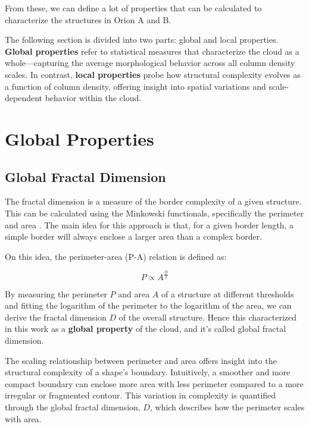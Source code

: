 From these, we can define a lot of properties that can be calculated to characterize the structures in Orion A and B. 

The following section is divided into two parts: global and local properties.  
\textbf{Global properties} refer to statistical measures that characterize the cloud as a whole—capturing the average morphological behavior across all column density scales.  
In contrast, \textbf{local properties} probe how structural complexity evolves as a function of column density, offering insight into spatial variations and scale-dependent behavior within the cloud.

\section{Global Properties}

\subsection{Global Fractal Dimension}

The fractal dimension is a measure of the border complexity of a given structure. This can be calculated using the Minkowski functionals, specifically the perimeter and area \cite{cannon1984fractal}. 
The main idea for this approach is that, for a given border length, a simple border will always enclose a larger area than a complex border.

On this idea, the perimeter-area (P-A) relation is defined as:

\begin{equation}
    \label{eq:perimeter_area}
    P \propto A^{\frac{D}{2}}
\end{equation}

By measuring the perimeter $P$ and area $A$ of a structure at different thresholds and fitting the logarithm of the perimeter to the logarithm of the area, we can derive the fractal dimension $D$ of the overall structure. Hence this characterized in this work as a \textbf{global property} of the cloud, and it's called global fractal dimension.

The scaling relationship between perimeter and area offers insight into the structural complexity of a shape’s boundary. Intuitively, a smoother and more compact boundary can enclose more area with less perimeter compared to a more irregular or fragmented contour. This variation in complexity is quantified through the global fractal dimension, \( D \), which describes how the perimeter scales with area.

